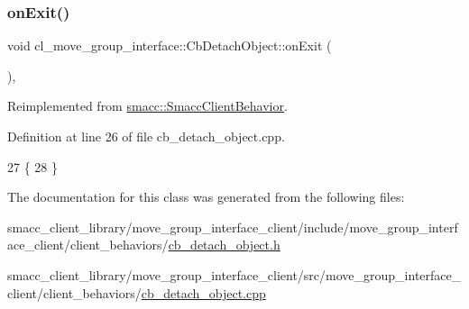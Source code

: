 \subsubsection{\texorpdfstring{on\+Exit()}{onExit()}}
{\footnotesize\ttfamily void cl\+\_\+move\+\_\+group\+\_\+interface\+::\+Cb\+Detach\+Object\+::on\+Exit (\begin{DoxyParamCaption}{ }\end{DoxyParamCaption})\hspace{0.3cm}{\ttfamily [override]}, {\ttfamily [virtual]}}



Reimplemented from \hyperlink{classsmacc_1_1SmaccClientBehavior_a7e4fb6ce81ff96dc172425852d69c0c5}{smacc\+::\+Smacc\+Client\+Behavior}.



Definition at line 26 of file cb\+\_\+detach\+\_\+object.\+cpp.


\begin{DoxyCode}
27     \{
28     \}
\end{DoxyCode}


The documentation for this class was generated from the following files\+:\begin{DoxyCompactItemize}
\item 
smacc\+\_\+client\+\_\+library/move\+\_\+group\+\_\+interface\+\_\+client/include/move\+\_\+group\+\_\+interface\+\_\+client/client\+\_\+behaviors/\hyperlink{cb__detach__object_8h}{cb\+\_\+detach\+\_\+object.\+h}\item 
smacc\+\_\+client\+\_\+library/move\+\_\+group\+\_\+interface\+\_\+client/src/move\+\_\+group\+\_\+interface\+\_\+client/client\+\_\+behaviors/\hyperlink{cb__detach__object_8cpp}{cb\+\_\+detach\+\_\+object.\+cpp}\end{DoxyCompactItemize}
